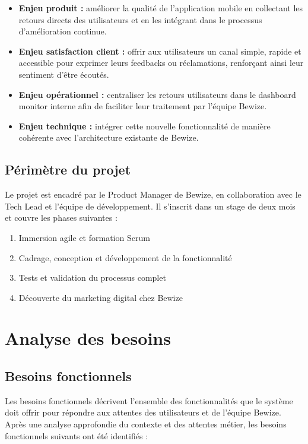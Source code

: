 \begin{itemize}
    \item \textbf{Enjeu produit :} améliorer la qualité de l'application 
    mobile en collectant les retours directs des utilisateurs et en les 
    intégrant dans le processus d'amélioration continue.
    
    \item \textbf{Enjeu satisfaction client :} offrir aux utilisateurs 
    un canal simple, rapide et accessible pour exprimer leurs feedbacks 
    ou réclamations, renforçant ainsi leur sentiment d'être écoutés.
    
    \item \textbf{Enjeu opérationnel :} centraliser les retours 
    utilisateurs dans le dashboard monitor interne afin de faciliter 
    leur traitement par l'équipe Bewize.
    
    \item \textbf{Enjeu technique :} intégrer cette nouvelle fonctionnalité 
    de manière cohérente avec l'architecture existante de Bewize.
\end{itemize}

\subsection{Périmètre du projet}
Le projet est encadré par le Product Manager de Bewize, en collaboration 
avec le Tech Lead et l'équipe de développement. Il s'inscrit dans un 
stage de deux mois et couvre les phases suivantes :

\begin{enumerate}
    \item Immersion agile et formation Scrum
    \item Cadrage, conception et développement de la fonctionnalité
    \item Tests et validation du processus complet
    \item Découverte du marketing digital chez Bewize
\end{enumerate}

\section{Analyse des besoins}

\subsection{Besoins fonctionnels}
Les besoins fonctionnels décrivent l'ensemble des fonctionnalités que 
le système doit offrir pour répondre aux attentes des utilisateurs et 
de l'équipe Bewize. Après une analyse approfondie du contexte et des 
attentes métier, les besoins fonctionnels suivants ont été identifiés :

